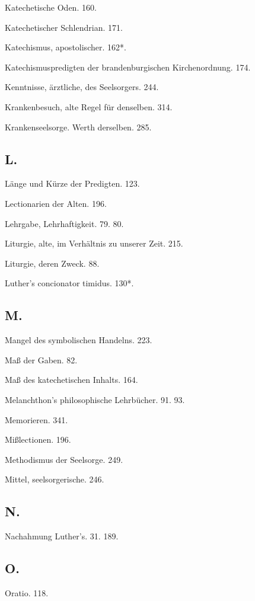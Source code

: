 Katechetische Oden. 160.

Katechetischer Schlendrian. 171.

Katechismus, apostolischer. 162*.

Katechismuspredigten der brandenburgischen Kirchenordnung. 174.

Kenntnisse, ärztliche, des Seelsorgers. 244.

Krankenbesuch, alte Regel für denselben. 314.

Krankenseelsorge. Werth derselben. 285.

\subsection*{L.}

Länge und Kürze der Predigten. 123.

Lectionarien der Alten. 196.

Lehrgabe, Lehrhaftigkeit. 79. 80.

Liturgie, alte, im Verhältnis zu unserer Zeit. 215.

Liturgie, deren Zweck. 88.

Luther’s concionator timidus. 130*.

\subsection*{M.}

Mangel des symbolischen Handelns. 223.

Maß der Gaben. 82.

Maß des katechetischen Inhalts. 164.

Melanchthon’s philosophische Lehrbücher. 91. 93.

Memorieren. 341.

Mißlectionen. 196.

Methodismus der Seelsorge. 249.

Mittel, seelsorgerische. 246.

\subsection*{N.}

Nachahmung Luther’s. 31. 189.

\subsection*{O.}

Oratio. 118.

